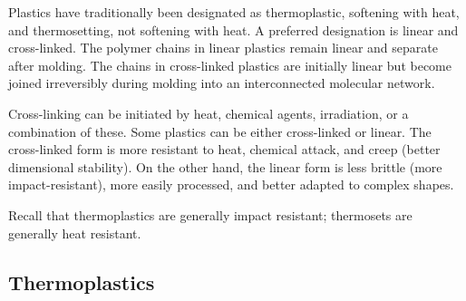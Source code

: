\documentclass[
10pt,
a4paper,
openany,
svgnames,
]{book}
\begin{document}
Plastics have traditionally been designated as thermoplastic, softening with heat, and thermosetting, not softening with heat. A preferred designation is linear and cross-linked. The polymer chains in linear plastics remain linear and separate after molding. The chains in cross-linked plastics are initially linear but become joined irreversibly during molding into an interconnected molecular network.

Cross-linking can be initiated by heat, chemical agents, irradiation, or a combination of these. Some plastics can be either cross-linked or linear. The cross-linked form is more resistant to heat, chemical attack, and creep (better dimensional stability). On the other hand, the linear form is less brittle (more impact-resistant), more easily processed, and better adapted to complex shapes.

Recall that thermoplastics are generally impact resistant; thermosets are generally heat resistant.

\subsection{Thermoplastics}
\end{document}
